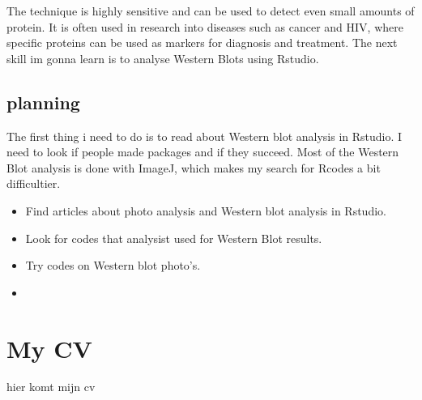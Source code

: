 \documentclass[
]{book}
\begin{document}
The technique is highly sensitive and can be used to detect even small amounts of protein. It is often used in research into diseases such as cancer and HIV, where specific proteins can be used as markers for diagnosis and treatment.
The next skill im gonna learn is to analyse Western Blots using Rstudio.

\hypertarget{planning}{%
\section{planning}\label{planning}}

The first thing i need to do is to read about Western blot analysis in Rstudio. I need to look if people made packages and if they succeed. Most of the Western Blot analysis is done with ImageJ, which makes my search for Rcodes a bit difficultier.

\begin{itemize}
\item
  Find articles about photo analysis and Western blot analysis in Rstudio.
\item
  Look for codes that analysist used for Western Blot results.
\item
  Try codes on Western blot photo's.
\item
\end{itemize}

\hypertarget{my-cv}{%
\chapter{My CV}\label{my-cv}}

hier komt mijn cv

  
\end{document}
